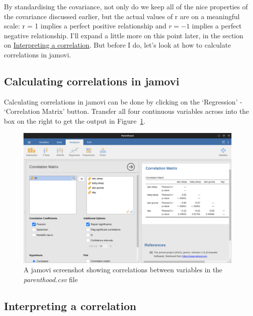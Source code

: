 \documentclass[
  a4paper,
]{book}
\begin{document}
By standardising the covariance, not only do we keep all of the nice
properties of the covariance discussed earlier, but the actual values of
r are on a meaningful scale: r = 1 implies a perfect positive
relationship and \(r = -1\) implies a perfect negative relationship.
I'll expand a little more on this point later, in the section on
\protect\hyperlink{interpreting-a-correlation}{Interpreting a
correlation}. But before I do, let's look at how to calculate
correlations in jamovi.

\hypertarget{calculating-correlations-in-jamovi}{%
\subsection{Calculating correlations in
jamovi}\label{calculating-correlations-in-jamovi}}

Calculating correlations in jamovi can be done by clicking on the
`Regression' - `Correlation Matrix' button. Transfer all four continuous
variables across into the box on the right to get the output in
Figure~\ref{fig-fig12-5}.

\begin{figure}

\includegraphics[width=1\textwidth,height=\textheight]{images/fig12-5.png} \hfill{}

\caption{\label{fig-fig12-5}A jamovi screenshot showing correlations
between variables in the \emph{parenthood.csv} file}

\end{figure}

\hypertarget{interpreting-a-correlation}{%
\subsection{Interpreting a
correlation}\label{interpreting-a-correlation}}
\end{document}
